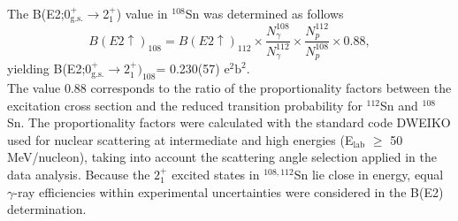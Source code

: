 \documentclass[prc,twocolumn,amssymb,amsmath,showpacs,superscriptaddress]{revtex4}
\begin{document}
The B(E2;0$^+_{\text{g.s.}}$$\to$2$^+_1$) value in $^{108}$Sn was
determined as follows
\begin{displaymath}
B(E2\uparrow)_{\text{108}} = B(E2\uparrow)_{\text{112}} \times
\frac{N^{\text{108}}_{\gamma}}{N^{\text{112}}_{\gamma}} \times
\frac{N^{\text{112}}_p}{N^{\text{108}}_p} \times 0.88,
\end{displaymath}
yielding B(E2;$0^+_{\text{g.s.}}\to2^+_1)_{\text{108}} $=
0.230(57) $\text{e}^{2}\text{b}^{2}$.\\
The value $0.88$ corresponds to the ratio of the proportionality
factors between the excitation cross section and the reduced
transition probability for $^{112}$Sn and $^{108}$Sn. The
proportionality factors were calculated with the standard code
DWEIKO \cite{ber03} used for nuclear scattering at intermediate
and high energies (E$_{\text{lab}}$ $\geqslant$ 50 MeV/nucleon),
taking into account the scattering angle selection applied in the
data analysis. Because the $2^{+}_{1}$ excited states in
$^{108,112}$Sn lie close in energy, equal $\gamma$-ray
efficiencies within experimental uncertainties were considered in
the B(E2) determination.
\end{document}
